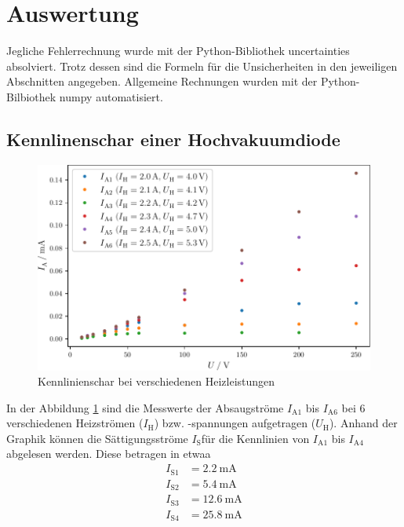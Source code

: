 \section{Auswertung}
\label{sec:Auswertung}
Jegliche Fehlerrechnung wurde mit der Python-Bibliothek uncertainties \cite{uncertainties} absolviert. Trotz dessen sind die Formeln für
die Unsicherheiten in den jeweiligen Abschnitten angegeben. Allgemeine Rechnungen wurden mit der Python-Bilbiothek numpy \cite{numpy} automatisiert.
\subsection{Kennlinenschar einer Hochvakuumdiode}
\begin{figure}
    \centering
    \caption{Kennlinienschar bei verschiedenen Heizleistungen}
    \label{fig:charcurve}
    \includegraphics[width = \textwidth]{build/charcurve.pdf}
\end{figure}
In der Abbildung \ref{fig:charcurve} sind die Messwerte  der Absaugströme $I_{\text{A}1}$ bis $I_{\text{A}6}$ bei  6 verschiedenen Heizströmen ($I_\text{H}$)
bzw. -spannungen aufgetragen ($U_\text{H}$). 
Anhand der Graphik können die Sättigungsströme $I_\text{S}$für die Kennlinien von $I_{\text{A}1}$ bis $I_{\text{A}4}$ abgelesen werden.
Diese betragen in etwaa
\begin{align*}
I_{\text{S}1} & = \SI{2.2}{\milli\ampere}   \\
I_{\text{S}2} & = \SI{5.4}{\milli\ampere}   \\
I_{\text{S}3} & = \SI{12.6}{\milli\ampere}  \\
I_{\text{S}4} & = \SI{25.8}{\milli\ampere}  \\
\end{align*}
